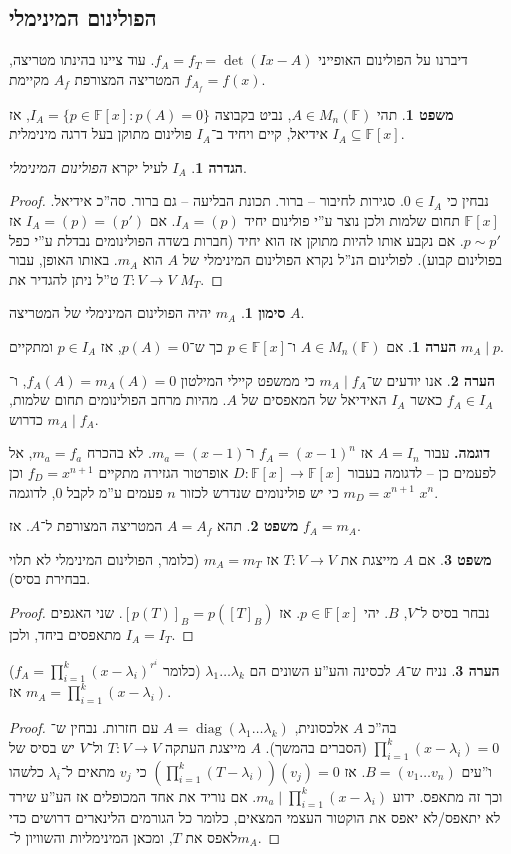 \documentclass[a4paper]{article}
\DeclareMathOperator{\diag}    {diag}
\newcommand\F         {\mathbb{F}}
\newcommand\co        {\colon}
\renewcommand\lg      {\lambda}
\newcommand\cl [1]    {\left ( #1 \right )}
\theoremstyle{definition}
\newtheorem{Theorem}{\color{myblue}משפט}
\newtheorem{Definition}{\color{mygreen}הגדרה}
\newtheorem{Remark}{\color{mycyan}הערה}
\newtheorem{Notion}{\color{myred}סימון}
\newcommand\theo  [1] {\begin{Theorem}#1\end{Theorem}}
\newcommand\defi  [1] {\begin{Definition}#1\end{Definition}}
\newcommand\rmark [1] {\begin{Remark}#1\end{Remark}}
\newcommand\noti  [1] {\begin{Notion}#1\end{Notion}}
\begin{document}
	\subsection{הפולינום המינימלי}
	
	דיברנו על הפולינום האופייני $f_A = f_T = \det(Ix - A)$. עוד ציינו בהינתו מטריצה, המטריצה המצורפת $A_f$ מקיימת $f_{A_f} = f(x)$. 
	
	
	\theo{תהי $A \in M_n(\F)$, נביט בקבוצה $I_A = \{p \in \F[x] \co p(A) = 0\}$, אז $I_A \subseteq \F[x]$ אידיאל, קיים ויחיד ב־$I_A$ פולינום מתוקן בעל דרגה מינימלית. }
	\defi{$I_A$ לעיל יקרא \textit{הפולינום המינימלי}. }
	\begin{proof}
		נבחין כי $0 \in I_A$. סגירות לחיבור – ברור. תכונת הבליעה – גם ברור. סה''כ אידיאל. 
		$\F[x]$ תחום שלמות ולכן נוצר ע''י פולינום יחיד $I_A = (p)$. אם $I_A = (p) = (p')$ אז $p \sim p'$. אם נקבע אותו להיות מתוקן אז הוא יחיד (חברות בשדה הפולינומים נבדלת ע''י כפל בפולינום קבוע).  לפולינום הנ''ל נקרא הפולינום המינימלי של $A$ הוא $m_A$. באותו האופן, עבור $T \co V \to V$ ט''ל ניתן להגדיר את $M_T$. 
	\end{proof}
	
	\noti{$m_A$ יהיה הפולינום המינימלי של המטריצה $A$. }
	
	\rmark{אם $A \in M_n(\F)$ ו־$p \in \F[x]$ כך ש־$p(A) = 0$, אז $p \in I_A$ ומתקיים $m_A \mid p$. }
	
	\rmark{אנו יודעים ש־$m_A \mid f_A$ כי ממשפט קיילי המילטון $f_A(A) = m_A(A) = 0$, ו־$f_A \in I_A$ כאשר $I_A$ האידיאל של המאפסים של $A$. מהיות מרחב הפולינומים תחום שלמות, $m_A \mid f_A$ כדרוש. }
	
	\textbf{דוגמה. }עבור $A = I_n$ אז $f_A = (x - 1)^{n}$ ו־$m_a = (x - 1)$. לא בהכרח $m_a = f_a$, אל לפעמים כן – לדגומה בעבור $D \co \F[x] \to \F[x]$ אופרטור הגזירה מתקיים $f_D = x^{n + 1}$ וכן $m_D = x^{n + 1}$ כי יש פולינומים שנדרש לכזור $n$ פעמים ע''מ לקבל $0$, לדוגמה $x^{n}$. 
	
	\theo{תהא $A =A_f$ המטריצה המצורפת ל־$A$. אז $f_A = m_A$.}
	\theo{אם $A$ מייצגת את $T \co V \to V$ אז $m_A = m_T$ (כלומר, הפולינום המינימלי לא תלוי בבחירת בסיס).}
	\begin{proof}
		נבחר בסיס ל־$V$, $B$. יהי $p \in \F[x]$. אז $[p(T)]_B = p([T]_B)$. שני האגפים מתאפסים ביחד, ולכן $I_A = I_T$. 
	\end{proof}
	\rmark{נניח ש־$A$ לכסינה והע''ע השונים הם $\lg_1 \dots \lg_k$ (כלומר $f_A = \prod_{i = 1}^{k}(x - \lg_i)^{r^i}$) אז $m_A = \prod_{i = 1}^{k}(x - \lg_i)$. }
	
	\begin{proof}
		בה''כ $A$ אלכסונית, $A = \diag(\lg_1 \dots \lg_k)$ עם חזרות. נבחין ש־$\prod_{i = 1}^{k} (x - \lg_i) = 0$ (הסברים בהמשך). $A$ מייצגת העתקה $T \co V \to V$ ול־$V$ יש בסיס של ו''עים $B = (v_1 \dots v_n)$.  אז $\cl{\prod_{i = 1}^{k}(T - \lg_i)}(v_j) = 0$ כי $v_j$ מתאים ל־$\lg_i$ כלשהו וכך זה מתאפס. ידוע $m_a \mid \prod_{i = 1}^{k}(x - \lg_i)$. אם נוריד את אחד המכופלים אז הע''ע שירד לא יתאפס/לא יאפס את הוקטור העצמי המצאים, כלומר כל הגורמים הלינארים דרושים כדי לאפס את $T$, ומכאן המינימליות והשוויון ל־$m_A$. 
	\end{proof}
	
\end{document}
